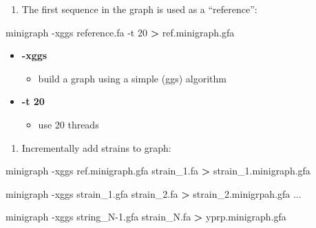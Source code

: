 \documentclass[
]{book}
\newenvironment{Shaded}{\begin{snugshade}}{\end{snugshade}}
\newcommand{\AttributeTok}[1]{\textcolor[rgb]{0.77,0.63,0.00}{#1}}
\newcommand{\ExtensionTok}[1]{#1}
\newcommand{\NormalTok}[1]{#1}
\newcommand{\OperatorTok}[1]{\textcolor[rgb]{0.81,0.36,0.00}{\textbf{#1}}}
\providecommand{\tightlist}{%
  \setlength{\itemsep}{0pt}\setlength{\parskip}{0pt}}
\begin{document}
\begin{enumerate}
\def\labelenumi{\arabic{enumi}.}
\tightlist
\item
  The first sequence in the graph is used as a ``reference'':
\end{enumerate}

\begin{Shaded}
\begin{Highlighting}[]
\ExtensionTok{minigraph} \AttributeTok{{-}xggs}\NormalTok{ reference.fa }\AttributeTok{{-}t}\NormalTok{ 20 }\OperatorTok{\textgreater{}}\NormalTok{ ref.minigraph.gfa}
\end{Highlighting}
\end{Shaded}

\begin{itemize}
\tightlist
\item
  \textbf{-xggs}

  \begin{itemize}
  \tightlist
  \item
    build a graph using a simple (ggs) algorithm
  \end{itemize}
\item
  \textbf{-t 20}

  \begin{itemize}
  \tightlist
  \item
    use 20 threads
  \end{itemize}
\end{itemize}

\begin{enumerate}
\def\labelenumi{\arabic{enumi}.}
\setcounter{enumi}{1}
\tightlist
\item
  Incrementally add strains to graph:
\end{enumerate}

\begin{Shaded}
\begin{Highlighting}[]
\ExtensionTok{minigraph} \AttributeTok{{-}xggs}\NormalTok{ ref.minigraph.gfa strain\_1.fa }\OperatorTok{\textgreater{}}\NormalTok{ strain\_1.minigraph.gfa}

\ExtensionTok{minigraph} \AttributeTok{{-}xggs}\NormalTok{ strain\_1.gfa strain\_2.fa }\OperatorTok{\textgreater{}}\NormalTok{ strain\_2.minigrpah.gfa}
\ExtensionTok{...}

\ExtensionTok{minigraph} \AttributeTok{{-}xggs}\NormalTok{ string\_N{-}1.gfa strain\_N.fa }\OperatorTok{\textgreater{}}\NormalTok{ yprp.minigraph.gfa}
\end{Highlighting}
\end{Shaded}
\end{document}
